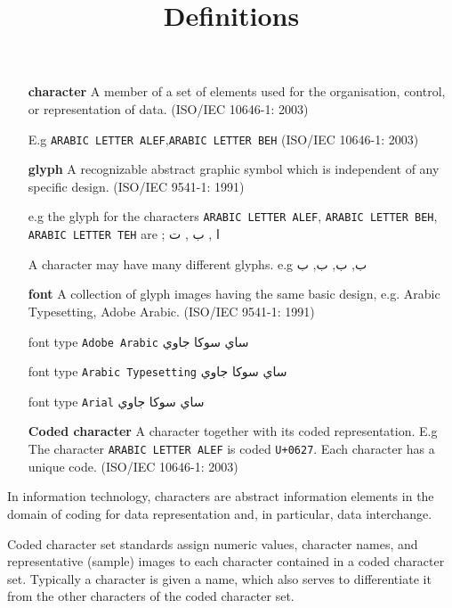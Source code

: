\documentclass{article} %
\title{Definitions}
\date{} %
\begin{document}
\maketitle

\begin{itemize}
\item[\textbf{character}] A member of a set of elements used for the organisation, control, or 
representation of data. (ISO/IEC 10646-1: 
2003)

E.g \texttt{ARABIC LETTER ALEF},\texttt{ARABIC LETTER BEH}  (ISO/IEC 10646-1: 2003)

\item[\textbf{glyph}] A recognizable abstract 
graphic symbol which is independent of any 
specific design. (ISO/IEC 9541-1: 1991) 

e.g the glyph for the characters \texttt{ARABIC LETTER ALEF}, \texttt{ARABIC LETTER BEH}, \texttt{ARABIC LETTER TEH} are ; 
{ ا , ب , ت 
}

A character may have many different glyphs. e.g { ب}, { ب}, { ب}, { ب}


\item[\textbf{font}] A collection of glyph images 
having the same basic design, e.g. \textsf{Arabic Typesetting}, \textsf{Adobe Arabic}. (ISO/IEC 9541-1: 1991)

font type \texttt{Adobe Arabic} \hskip 1cm { ساي سوکا جاوي}

font type \texttt{Arabic Typesetting} \hskip 1cm  { ساي سوکا جاوي}

font type \texttt{Arial} \hskip 2cm  { ساي سوکا جاوي}

\item[\textbf{Coded character}] A character together with its coded representation. E.g The character \texttt{ARABIC LETTER ALEF} is coded \texttt{U+0627}. Each character has a unique code. (ISO/IEC 10646-1: 
2003)
\end{itemize}

In information technology,  characters  are 
abstract information elements in the domain 
of coding for data representation and, in 
particular, data interchange. 

Coded character set standards assign numeric values, 
character names, and representative (sample) images to each character contained in 
a coded character set. Typically a character 
is given a name, which also serves to differentiate it from the other characters of the 
coded character set. 
\end{document}
